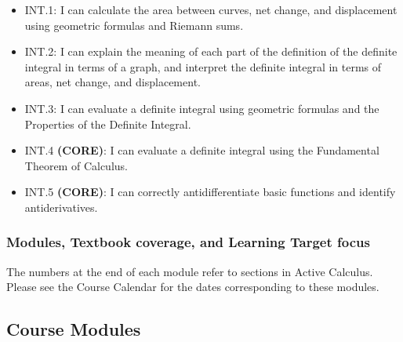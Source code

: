 \documentclass[]{article}
\providecommand{\tightlist}{%
  \setlength{\itemsep}{0pt}\setlength{\parskip}{0pt}}
\begin{document}
\begin{itemize}
  \begin{itemize}
  \tightlist
  \item
    INT.1: I can calculate the area between curves, net change, and
    displacement using geometric formulas and Riemann sums.
  \item
    INT.2: I can explain the meaning of each part of the definition of
    the definite integral in terms of a graph, and interpret the
    definite integral in terms of areas, net change, and displacement.
  \item
    INT.3: I can evaluate a definite integral using geometric formulas
    and the Properties of the Definite Integral.
  \item
    INT.4 \textbf{(CORE)}: I can evaluate a definite integral using the
    Fundamental Theorem of Calculus.
  \item
    INT.5 \textbf{(CORE)}: I can correctly antidifferentiate basic
    functions and identify antiderivatives.
  \end{itemize}
\end{itemize}

\hypertarget{modules-textbook-coverage-and-learning-target-focus}{%
\subsubsection{Modules, Textbook coverage, and Learning Target
focus}\label{modules-textbook-coverage-and-learning-target-focus}}

The numbers at the end of each module refer to sections in Active
Calculus. Please see the Course Calendar for the dates corresponding to
these modules.

\hypertarget{course-modules}{%
\subsection{Course Modules}\label{course-modules}}
\end{document}
